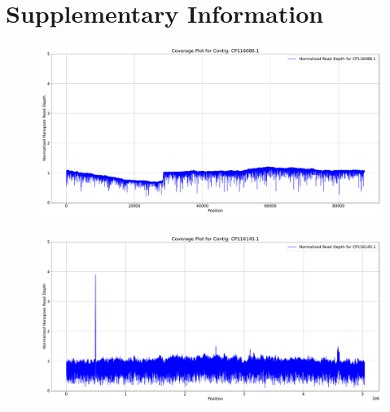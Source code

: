 
\onecolumn %
\fancyhead{} %
\renewcommand{\floatpagefraction}{0.1}
\lfoot[\bSupInf]{\dAuthor}
\rfoot[\dAuthor]{\cSupInf}
\newpage

\captionsetup*{format=largeformat} %
\setcounter{figure}{0} %
\setcounter{equation}{0} %
\makeatletter 
\renewcommand{\thefigure}{S\@arabic\c@figure} %
\makeatother
\def\theequation{S\arabic{equation}}


\newpage
\section*{Supplementary Information}

\begin{figure}[!ht]
\centering
\includegraphics[width=0.75\linewidth]{Figures/figure_S1.pdf}
\caption{}
\label{suppfig:endosome}
\end{figure}


\begin{figure}[!ht]
\centering
\includegraphics[width=1\linewidth]{Figures/figure_S3.pdf}
\caption{}
\label{suppfig:endosome}
\end{figure}